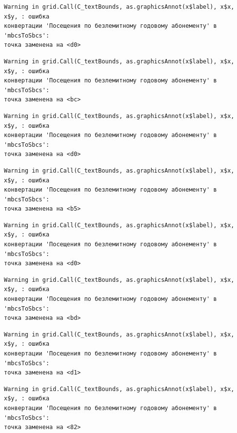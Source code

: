 \documentclass[
  letterpaper,
  DIV=11,
  numbers=noendperiod]{scrreprt}
\begin{document}
\begin{verbatim}
Warning in grid.Call(C_textBounds, as.graphicsAnnot(x$label), x$x, x$y, : ошибка
конвертации 'Посещения по безлемитному годовому абонементу' в 'mbcsToSbcs':
точка заменена на <d0>
\end{verbatim}

\begin{verbatim}
Warning in grid.Call(C_textBounds, as.graphicsAnnot(x$label), x$x, x$y, : ошибка
конвертации 'Посещения по безлемитному годовому абонементу' в 'mbcsToSbcs':
точка заменена на <bc>
\end{verbatim}

\begin{verbatim}
Warning in grid.Call(C_textBounds, as.graphicsAnnot(x$label), x$x, x$y, : ошибка
конвертации 'Посещения по безлемитному годовому абонементу' в 'mbcsToSbcs':
точка заменена на <d0>
\end{verbatim}

\begin{verbatim}
Warning in grid.Call(C_textBounds, as.graphicsAnnot(x$label), x$x, x$y, : ошибка
конвертации 'Посещения по безлемитному годовому абонементу' в 'mbcsToSbcs':
точка заменена на <b5>
\end{verbatim}

\begin{verbatim}
Warning in grid.Call(C_textBounds, as.graphicsAnnot(x$label), x$x, x$y, : ошибка
конвертации 'Посещения по безлемитному годовому абонементу' в 'mbcsToSbcs':
точка заменена на <d0>
\end{verbatim}

\begin{verbatim}
Warning in grid.Call(C_textBounds, as.graphicsAnnot(x$label), x$x, x$y, : ошибка
конвертации 'Посещения по безлемитному годовому абонементу' в 'mbcsToSbcs':
точка заменена на <bd>
\end{verbatim}

\begin{verbatim}
Warning in grid.Call(C_textBounds, as.graphicsAnnot(x$label), x$x, x$y, : ошибка
конвертации 'Посещения по безлемитному годовому абонементу' в 'mbcsToSbcs':
точка заменена на <d1>
\end{verbatim}

\begin{verbatim}
Warning in grid.Call(C_textBounds, as.graphicsAnnot(x$label), x$x, x$y, : ошибка
конвертации 'Посещения по безлемитному годовому абонементу' в 'mbcsToSbcs':
точка заменена на <82>
\end{verbatim}
\end{document}
